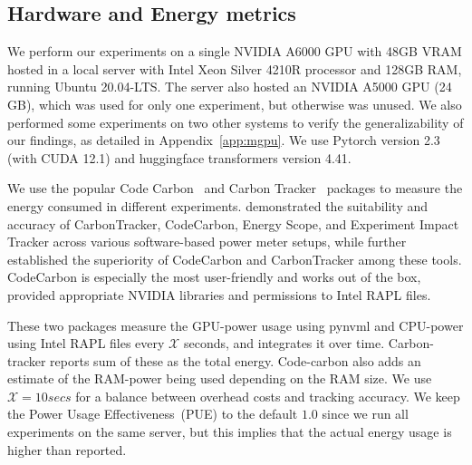 






\subsection{Hardware and Energy metrics}
We perform our experiments on a single NVIDIA A6000 GPU with 48GB VRAM hosted in a local server with Intel Xeon Silver 4210R processor and 128GB RAM, running Ubuntu 20.04-LTS. 
The server also hosted an NVIDIA A5000 GPU (24 GB), which was used for only one experiment, but otherwise was unused.
We also performed some experiments on two other systems to verify the generalizability of our findings, as detailed in Appendix~\ref{app:mgpu}.
We use Pytorch version 2.3 (with CUDA 12.1) and huggingface transformers version 4.41.

We use the popular Code Carbon~\cite{schmidt2021codecarbon} and Carbon Tracker~\cite{anthony2020carbontracker} packages to measure the energy consumed in different experiments. 
\citet{jay2023experimental} demonstrated the suitability and accuracy of CarbonTracker, CodeCarbon, Energy Scope, and Experiment Impact Tracker across various software-based power meter setups, while \citet{bouza2023estimate} further established the superiority of CodeCarbon and CarbonTracker among these tools. CodeCarbon is especially the most user-friendly and works out of the box, provided appropriate NVIDIA libraries and permissions to Intel RAPL files.


%
These two packages measure the GPU-power usage using pynvml and CPU-power using Intel RAPL files every $\mathcal{X}$ seconds, and integrates it over time. Carbon-tracker reports sum of these as the total energy.
Code-carbon also adds an estimate of the RAM-power being used depending on the RAM size. 
We use $\mathcal{X} = 10secs$ for a balance between overhead costs and tracking accuracy.
We keep the Power Usage Effectiveness~(PUE) to the default $1.0$ since we run all experiments on the same server, but this implies that the actual energy usage is higher than reported.



